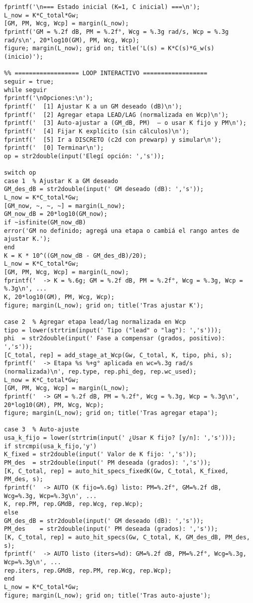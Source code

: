 \begin{lstlisting}[style=matlabstyle,caption={Hoja cálculos utilizada para el diseño de los compensadores.},label={matlab:hojaDeCalculos}]
%% ================== ESTADO INICIAL (CONTINUO, PLANO w) ==================
fprintf('\n=== Estado inicial (K=1, C inicial) ===\n');
L_now = K*C_total*Gw;
[GM, PM, Wcg, Wcp] = margin(L_now);
fprintf('GM = %.2f dB, PM = %.2f°, Wcg = %.3g rad/s, Wcp = %.3g rad/s\n', 20*log10(GM), PM, Wcg, Wcp);
figure; margin(L_now); grid on; title('L(s) = K*C(s)*G_w(s)  (inicio)');

%% ================== LOOP INTERACTIVO ==================
seguir = true;
while seguir
fprintf('\nOpciones:\n');
fprintf('  [1] Ajustar K a un GM deseado (dB)\n');
fprintf('  [2] Agregar etapa LEAD/LAG (normalizada en Wcp)\n');
fprintf('  [3] Auto-ajustar a (GM_dB, PM)  — o usar K fijo y PM\n');
fprintf('  [4] Fijar K explícito (sin cálculos)\n');
fprintf('  [5] Ir a DISCRETO (c2d con prewarp) y simular\n');
fprintf('  [0] Terminar\n');
op = str2double(input('Elegí opción: ','s'));

switch op
case 1  % Ajustar K a GM deseado
GM_des_dB = str2double(input(' GM deseado (dB): ','s'));
L_now = K*C_total*Gw;
[GM_now, ~, ~, ~] = margin(L_now);
GM_now_dB = 20*log10(GM_now);
if ~isfinite(GM_now_dB)
error('GM no definido; agregá una etapa o cambiá el rango antes de ajustar K.');
end
K = K * 10^((GM_now_dB - GM_des_dB)/20);
L_now = K*C_total*Gw;
[GM, PM, Wcg, Wcp] = margin(L_now);
fprintf('  -> K = %.6g; GM = %.2f dB, PM = %.2f°, Wcg = %.3g, Wcp = %.3g\n', ...
K, 20*log10(GM), PM, Wcg, Wcp);
figure; margin(L_now); grid on; title('Tras ajustar K');

case 2  % Agregar etapa lead/lag normalizada en Wcp
tipo = lower(strtrim(input(' Tipo ("lead" o "lag"): ','s')));
phi  = str2double(input(' Fase a compensar (grados, positivo): ','s'));
[C_total, rep] = add_stage_at_Wcp(Gw, C_total, K, tipo, phi, s);
fprintf('  -> Etapa %s %+g° aplicada en wc=%.3g rad/s (normalizada)\n', rep.type, rep.phi_deg, rep.wc_used);
L_now = K*C_total*Gw;
[GM, PM, Wcg, Wcp] = margin(L_now);
fprintf('  -> GM = %.2f dB, PM = %.2f°, Wcg = %.3g, Wcp = %.3g\n', 20*log10(GM), PM, Wcg, Wcp);
figure; margin(L_now); grid on; title('Tras agregar etapa');

case 3  % Auto-ajuste
usa_k_fijo = lower(strtrim(input(' ¿Usar K fijo? [y/n]: ','s')));
if strcmpi(usa_k_fijo,'y')
K_fixed = str2double(input(' Valor de K fijo: ','s'));
PM_des  = str2double(input(' PM deseada (grados): ','s'));
[K, C_total, rep] = auto_hit_specs_fixedK(Gw, C_total, K_fixed, PM_des, s);
fprintf('  -> AUTO (K fijo=%.6g) listo: PM=%.2f°, GM=%.2f dB, Wcg=%.3g, Wcp=%.3g\n', ...
K, rep.PM, rep.GMdB, rep.Wcg, rep.Wcp);
else
GM_des_dB = str2double(input(' GM deseado (dB): ','s'));
PM_des    = str2double(input(' PM deseada (grados): ','s'));
[K, C_total, rep] = auto_hit_specs(Gw, C_total, K, GM_des_dB, PM_des, s);
fprintf('  -> AUTO listo (iters=%d): GM=%.2f dB, PM=%.2f°, Wcg=%.3g, Wcp=%.3g\n', ...
rep.iters, rep.GMdB, rep.PM, rep.Wcg, rep.Wcp);
end
L_now = K*C_total*Gw;
figure; margin(L_now); grid on; title('Tras auto-ajuste');


\end{lstlisting}

